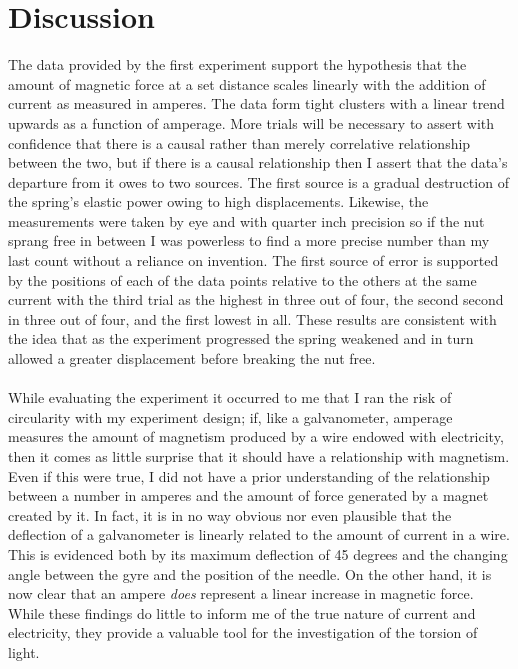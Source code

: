 \documentclass{article}
\begin{document}
\newpage
\section{Discussion}
The data provided by the first experiment support the hypothesis that the amount of magnetic force at a set distance scales linearly with the addition of current as measured in amperes. The data form tight clusters with a linear trend upwards as a function of amperage. More trials will be necessary to assert with confidence that there is a causal rather than merely correlative relationship between the two, but if there is a causal relationship then I assert that the data's departure from it owes to two sources. The first source is a gradual destruction of the spring's elastic power owing to high displacements. Likewise, the measurements were taken by eye and with quarter inch precision so if the nut sprang free in between I was powerless to find a more precise number than my last count without a reliance on invention. The first source of error is supported by the positions of each of the data points relative to the others at the same current with the third trial as the highest in three out of four, the second second in three out of four, and the first lowest in all. These results are consistent with the idea that as the experiment progressed the spring weakened and in turn allowed a greater displacement before breaking the nut free.\paragraph{} While evaluating the experiment it occurred to me that I ran the risk of circularity with my experiment design; if, like a galvanometer, amperage measures the amount of magnetism produced by a wire endowed with electricity, then it comes as little surprise that it should have a relationship with magnetism. Even if this were true, I did not have a prior understanding of the relationship between a number in amperes and the amount of force generated by a magnet created by it. In fact, it is in no way obvious nor even plausible that the deflection of a galvanometer is linearly related to the amount of current in a wire. This is evidenced both by its maximum deflection of 45 degrees and the changing angle between the gyre and the position of the needle. On the other hand, it is now clear that an ampere \textit{does} represent a linear increase in magnetic force. While these findings do little to inform me of the true nature of current and electricity, they provide a valuable tool for the investigation of the torsion of light. \paragraph{}
\end{document}
